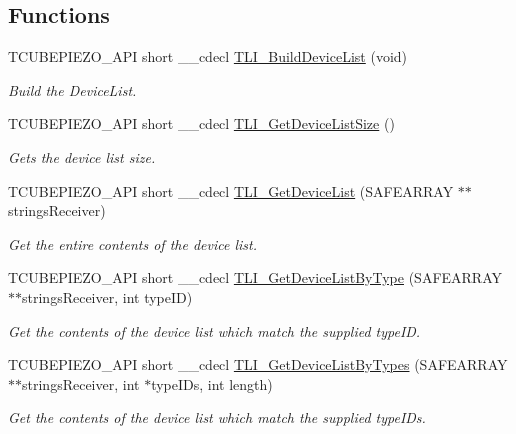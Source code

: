 \subsection*{Functions}
\begin{DoxyCompactItemize}
\item 
T\+C\+U\+B\+E\+P\+I\+E\+Z\+O\+\_\+\+A\+PI short \+\_\+\+\_\+cdecl \hyperlink{group___t_cube_piezo_ga3a4c7611b972473cd2180c6d05bef47c}{T\+L\+I\+\_\+\+Build\+Device\+List} (void)
\begin{DoxyCompactList}\small\item\em Build the Device\+List. \end{DoxyCompactList}\item 
T\+C\+U\+B\+E\+P\+I\+E\+Z\+O\+\_\+\+A\+PI short \+\_\+\+\_\+cdecl \hyperlink{group___t_cube_piezo_gaf63844934a3652bb44da332ea4dc1d2f}{T\+L\+I\+\_\+\+Get\+Device\+List\+Size} ()
\begin{DoxyCompactList}\small\item\em Gets the device list size. \end{DoxyCompactList}\item 
T\+C\+U\+B\+E\+P\+I\+E\+Z\+O\+\_\+\+A\+PI short \+\_\+\+\_\+cdecl \hyperlink{group___t_cube_piezo_ga1f4db92776ddd518ca1cec2cebb54201}{T\+L\+I\+\_\+\+Get\+Device\+List} (S\+A\+F\+E\+A\+R\+R\+AY $\ast$$\ast$strings\+Receiver)
\begin{DoxyCompactList}\small\item\em Get the entire contents of the device list. \end{DoxyCompactList}\item 
T\+C\+U\+B\+E\+P\+I\+E\+Z\+O\+\_\+\+A\+PI short \+\_\+\+\_\+cdecl \hyperlink{group___t_cube_piezo_ga62dccac72f28b7b184b1915f546e50dd}{T\+L\+I\+\_\+\+Get\+Device\+List\+By\+Type} (S\+A\+F\+E\+A\+R\+R\+AY $\ast$$\ast$strings\+Receiver, int type\+ID)
\begin{DoxyCompactList}\small\item\em Get the contents of the device list which match the supplied type\+ID. \end{DoxyCompactList}\item 
T\+C\+U\+B\+E\+P\+I\+E\+Z\+O\+\_\+\+A\+PI short \+\_\+\+\_\+cdecl \hyperlink{group___t_cube_piezo_ga4f69595047a4305d1dd599768c57171f}{T\+L\+I\+\_\+\+Get\+Device\+List\+By\+Types} (S\+A\+F\+E\+A\+R\+R\+AY $\ast$$\ast$strings\+Receiver, int $\ast$type\+I\+Ds, int length)
\begin{DoxyCompactList}\small\item\em Get the contents of the device list which match the supplied type\+I\+Ds. \end{DoxyCompactList}\item 
$$
\end{DoxyCompactItemize}
